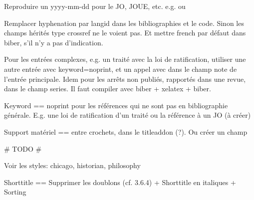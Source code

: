 Reproduire un {yyyy-mm-dd} pour le JO, JOUE, etc. e.g.  ou 

Remplacer {hyphenation} par {langid} dans les bibliographies et le code. Sinon les champs hérités type crossref ne le voient pas. Et mettre {french} par défaut dans biber, s'il n'y a pas d'indication.

Pour les entrées complexes, e.g. un traité avec la loi de ratification, utiliser une autre entrée avec keyword=noprint, et un appel avec \cite{X} dans le champ {note} de l'entrée principale. Idem pour les arrêts non publiés, rapportés dans une revue, dans le champ {series}. Il faut compiler avec biber + xelatex + biber.

Keyword == noprint pour les références qui ne sont pas en bibliographie générale. E.g. une loi de ratification d'un traité ou la référence à un JO (à créer)

Support matériel == entre crochets, dans le {titleaddon} (?). Ou créer un champ



# TODO #

Voir les styles: chicago, historian, philosophy

Shorttitle		== Supprimer les doublons (cf. 3.6.4) + Shorttitle en italiques + Sorting
